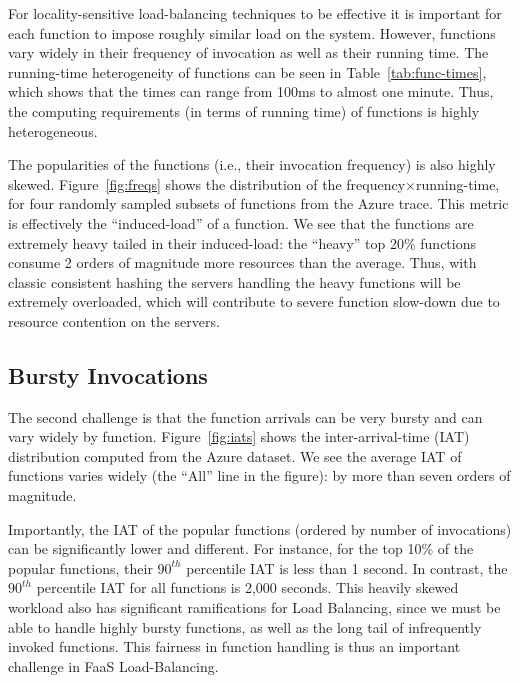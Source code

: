 For locality-sensitive load-balancing techniques to be effective it is important for each function to impose roughly similar load on the system. 
However, functions vary widely in their frequency of invocation as well as their running time. 
The running-time heterogeneity of functions can be seen in Table~\ref{tab:func-times}, which shows that the times can range from 100ms to almost one minute.
Thus, the computing requirements (in terms of running time) of functions is highly heterogeneous. 

The popularities of the functions (i.e., their invocation frequency) is also highly skewed. 
Figure~\ref{fig:freqs} shows the distribution of the frequency$\times$running-time, for four randomly sampled subsets of functions from the Azure trace. 
This metric is effectively the ``induced-load'' of a function. 
We see that the functions are extremely heavy tailed in their induced-load: the ``heavy'' top 20\% functions consume 2 orders of magnitude more resources than the average. 
Thus, with classic consistent hashing the servers handling the heavy functions will be extremely overloaded, which will contribute to severe function slow-down due to resource contention on the servers. 

\vspace*{-0.2cm}
\subsection{Bursty Invocations}

The second challenge is that the function arrivals can be very bursty and can vary widely by function. 
Figure~\ref{fig:iats} shows the inter-arrival-time (IAT) distribution computed from the Azure dataset.
We see the average IAT of functions varies widely (the ``All'' line in the figure): by more than seven orders of magnitude.

Importantly, the IAT of the popular functions (ordered by number of invocations) can be significantly lower and different. For instance, for the top 10\% of the popular functions, their $90^{th}$ percentile IAT is less than 1 second. In contrast, the $90^{th}$ percentile IAT for all functions is 2,000 seconds.
%
This heavily skewed workload also has significant ramifications for Load Balancing, since we must be able to handle highly bursty functions, as well as the long tail of infrequently invoked functions.
This fairness in function handling is thus an important challenge in FaaS Load-Balancing. 


